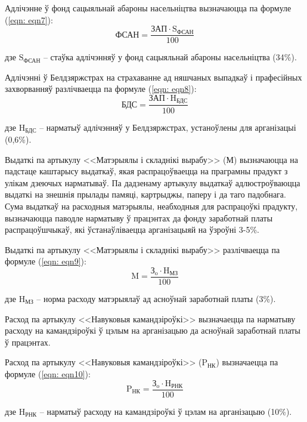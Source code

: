 Адлічэнне ў фонд сацыяльнай абароны насельніцтва вызначаюцца па формуле (\ref{eqn: eqn7}):
\begin{equation}
    \label{eqn: eqn7}
    \text{ФСАН} = \frac{\text{ЗАП} \cdot \text{S}_\text{ФСАН}}{100}
\end{equation}
\begin{Explanation}
    \item[дзе] $\text{S}_\text{ФСАН}$ -- стаўка адлічэнняў у фонд сацыяльнай абароны насельніцтва (34\%).
\end{Explanation}

Адлічэнні ў Белдзяржстрах на страхаванне ад няшчаных выпадкаў і прафесійных захворванняў разлічваецца па формуле (\ref{eqn: eqn8}):
\begin{equation}
    \label{eqn: eqn8}
    \text{БДС} = \frac{\text{ЗАП} \cdot \text{H}_\text{БДС}}{100}
\end{equation}
\begin{Explanation}
    \item[дзе] $\text{H}_\text{БДС}$ -- нарматыў адлічэнняў у Белдзяржстрах, устаноўлены для арганізацыі (0,6\%).
\end{Explanation}

Выдаткі па артыкулу <<Матэрыялы і складнікі вырабу>> (М) вызначаюцца
на падстаце каштарысу выдаткаў, якая распрацоўваецца на праграмны
прадукт з улікам дзеючых нарматываў. Па дадзенаму артыкулу выдаткаў
адлюстроўваюцца выдаткі на знешнія прылады памяці, картрыджы, паперу і да таго падобнага. Сума выдаткаў на расходныя матэрыялы,
неабходныя для распрацоўкі прадукту, вызначаюцца паводле нарматыву
ў працэнтах да фонду заработнай платы распрацоўшчыкаў, які ўстанаўліваецца арганізацыяй на ўзроўні 3-5\%.

Выдаткі па артыкулу <<Матэрыялы і складнікі вырабу>> разлічваецца
па формуле (\ref{eqn: eqn9}):
\begin{equation}
    \label{eqn: eqn9}
    \text{M} = \frac{\text{З}_\text{o} \cdot \text{H}_\text{МЗ}}{100}
\end{equation}
\begin{Explanation}
    \item[дзе] $\text{H}_\text{МЗ}$ -- норма расходу матэрыялаў ад асноўнай заработнай платы (3\%).
\end{Explanation}

Расход па артыкулу <<Навуковыя камандзіроўкі>> вызначаецца па нарматыву расходу на камандзіроўкі ў цэлым на арганізацыю да асноўнай заработнай платы ў працэнтах.

Расход па артыкулу <<Навуковыя камандзіроўкі>> ($\text{P}_\text{НК}$) вызначаецца па формуле (\ref{eqn: eqn10}):
\begin{equation}
    \label{eqn: eqn10}
    \text{P}_\text{НК} = \frac{\text{З}_\text{o} \cdot \text{H}_\text{РНК}}{100}
\end{equation}
\begin{Explanation}
    \item[дзе] $\text{H}_\text{РНК}$ -- нарматыў расходу на камандзіроўкі ў цэлам на арганізацыю (10\%).
\end{Explanation}

